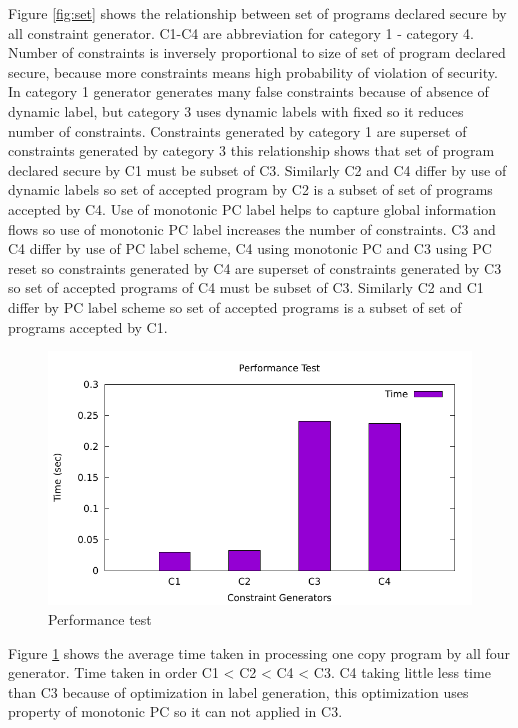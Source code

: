 	Figure \ref{fig:set} shows the relationship between set of programs declared secure by all constraint generator. C1-C4 are abbreviation for category 1 - category 4. Number of constraints is inversely proportional to size of set of program declared secure, because more constraints means high probability of violation of security. In category 1 generator generates many false constraints because of absence of dynamic label, but category 3 uses dynamic labels with fixed so it reduces number of constraints. Constraints generated by category 1 are superset of constraints generated by category 3 this relationship shows that set of program declared secure by C1 must be subset of C3. Similarly C2 and C4 differ by use of dynamic labels so set of accepted program by C2 is a subset of set of programs accepted by C4. Use of monotonic PC label helps to capture global information flows so use of monotonic PC label increases the number of constraints. C3 and C4 differ by use of PC label scheme, C4 using monotonic PC and C3 using PC reset so constraints generated by C4 are superset of constraints generated by C3 so set of accepted programs of C4 must be subset of C3. Similarly C2 and C1 differ by PC label scheme so set of accepted programs is a subset of set of programs accepted by C1.    
	\begin{figure}
		\includegraphics[width=1\textwidth]{graph.pdf}
		\centering
		\caption{Performance test}
		\label{fig:ptest}
	\end{figure}
	\pagebreak
	Figure \ref{fig:ptest} shows the average time taken in processing one copy program by all four generator. 
	Time taken in order C1 < C2 < C4 < C3. C4 taking little less time than C3 because of optimization in label generation, this optimization uses property of monotonic PC so it can not applied in C3.